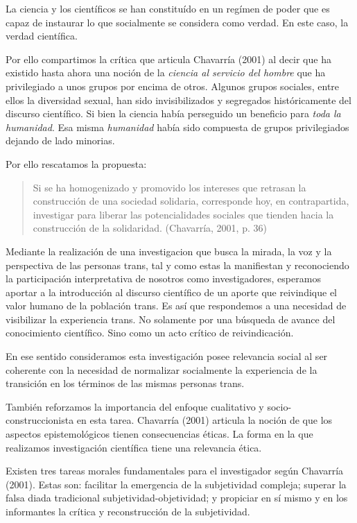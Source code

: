 La ciencia y los científicos se han constituído en un regímen de poder que es
capaz de instaurar lo que socialmente se considera como verdad.
En este caso, la verdad científica.

Por ello compartimos la crítica que articula Chavarría (2001) al decir que ha
existido hasta ahora una noción de la \emph{ciencia al servicio del hombre}
que ha privilegiado a unos grupos por encima de otros.
Algunos grupos sociales, entre ellos la diversidad sexual, han sido
invisibilizados y segregados históricamente del discurso científico.
Si bien la ciencia había perseguido un beneficio para \emph{toda la humanidad}.
Esa misma \emph{humanidad} había sido compuesta de grupos privilegiados
dejando de lado minorias.

Por ello rescatamos la propuesta:

\begin{quote}
    Si se ha homogenizado y promovido los intereses que retrasan la construcción de
    una sociedad solidaria, corresponde hoy, en contrapartida, investigar para
    liberar las potencialidades sociales que tienden hacia la construcción de la
    solidaridad. (Chavarría, 2001, p. 36)
\end{quote}

Mediante la realización de una investigacion que busca la mirada,
la voz y la perspectiva de las personas trans, tal y como estas la
manifiestan y reconociendo la participación interpretativa de nosotros como
investigadores, esperamos aportar a la introducción al discurso científico de
un aporte que reivindique el valor humano de la población trans.
Es así que respondemos a una necesidad de visibilizar la experiencia trans.
No solamente por una búsqueda de avance del conocimiento científico.
Sino como un acto crítico de reivindicación.

En ese sentido consideramos esta investigación posee relevancia social al ser
coherente con la necesidad de normalizar socialmente la experiencia de la
transición en los términos de las mismas personas trans.

También reforzamos la importancia del enfoque cualitativo y
socio-construccionista en esta tarea.
Chavarría (2001) articula la noción de que los aspectos epistemológicos
tienen consecuencias éticas.
La forma en la que realizamos investigación científica tiene una relevancia
ética.

Existen tres tareas morales fundamentales para el investigador según
Chavarría (2001).
Estas son: facilitar la emergencia de la subjetividad compleja;
superar la falsa diada tradicional subjetividad-objetividad;
y propiciar en sí mismo y en los informantes la crítica y reconstrucción de
la subjetividad.

